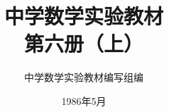\documentclass[b5paper, openany]{ctexbook}
\theoremstyle{plain}
\begin{document}














\title{\Huge\bfseries 中学数学实验教材\\第六册（上）}



\author{\Large 中学数学实验教材编写组编}
\date{\Large 1986年5月}

\maketitle




\frontmatter

% 
\tableofcontents


\mainmatter









\backmatter


\end{document}
